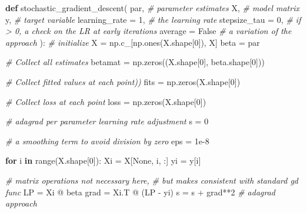 \documentclass[
  letterpaper,
]{krantz}
\newenvironment{Shaded}{}{}
\newcommand{\BuiltInTok}[1]{\textcolor[rgb]{0.00,0.50,0.00}{#1}}
\newcommand{\CommentTok}[1]{\textcolor[rgb]{0.38,0.63,0.69}{\textit{#1}}}
\newcommand{\ControlFlowTok}[1]{\textcolor[rgb]{0.00,0.44,0.13}{\textbf{#1}}}
\newcommand{\DecValTok}[1]{\textcolor[rgb]{0.25,0.63,0.44}{#1}}
\newcommand{\FloatTok}[1]{\textcolor[rgb]{0.25,0.63,0.44}{#1}}
\newcommand{\KeywordTok}[1]{\textcolor[rgb]{0.00,0.44,0.13}{\textbf{#1}}}
\newcommand{\NormalTok}[1]{#1}
\newcommand{\OperatorTok}[1]{\textcolor[rgb]{0.40,0.40,0.40}{#1}}
\newcommand{\VariableTok}[1]{\textcolor[rgb]{0.10,0.09,0.49}{#1}}
\begin{document}
\begin{Shaded}
\begin{Highlighting}[]
\KeywordTok{def}\NormalTok{ stochastic\_gradient\_descent(}
\NormalTok{    par, }\CommentTok{\# parameter estimates}
\NormalTok{    X, }\CommentTok{\# model matrix}
\NormalTok{    y, }\CommentTok{\# target variable}
\NormalTok{    learning\_rate }\OperatorTok{=} \DecValTok{1}\NormalTok{, }\CommentTok{\# the learning rate}
\NormalTok{    stepsize\_tau }\OperatorTok{=} \DecValTok{0}\NormalTok{, }\CommentTok{\# if \textgreater{} 0, a check on the LR at early iterations}
\NormalTok{    average }\OperatorTok{=} \VariableTok{False} \CommentTok{\# a variation of the approach}
\NormalTok{):}
    \CommentTok{\# initialize}
\NormalTok{    X }\OperatorTok{=}\NormalTok{ np.c\_[np.ones(X.shape[}\DecValTok{0}\NormalTok{]), X]}
\NormalTok{    beta }\OperatorTok{=}\NormalTok{ par}

    \CommentTok{\# Collect all estimates}
\NormalTok{    betamat }\OperatorTok{=}\NormalTok{ np.zeros((X.shape[}\DecValTok{0}\NormalTok{], beta.shape[}\DecValTok{0}\NormalTok{]))}

    \CommentTok{\# Collect fitted values at each point))}
\NormalTok{    fits }\OperatorTok{=}\NormalTok{ np.zeros(X.shape[}\DecValTok{0}\NormalTok{])}

    \CommentTok{\# Collect loss at each point}
\NormalTok{    loss }\OperatorTok{=}\NormalTok{ np.zeros(X.shape[}\DecValTok{0}\NormalTok{])}

    \CommentTok{\# adagrad per parameter learning rate adjustment}
\NormalTok{    s }\OperatorTok{=} \DecValTok{0}

    \CommentTok{\# a smoothing term to avoid division by zero}
\NormalTok{    eps }\OperatorTok{=} \FloatTok{1e{-}8}

    \ControlFlowTok{for}\NormalTok{ i }\KeywordTok{in} \BuiltInTok{range}\NormalTok{(X.shape[}\DecValTok{0}\NormalTok{]):}
\NormalTok{        Xi }\OperatorTok{=}\NormalTok{ X[}\VariableTok{None}\NormalTok{, i, :]}
\NormalTok{        yi }\OperatorTok{=}\NormalTok{ y[i]}

        \CommentTok{\# matrix operations not necessary here,}
        \CommentTok{\# but makes consistent with standard gd func}
\NormalTok{        LP }\OperatorTok{=}\NormalTok{ Xi }\OperatorTok{@}\NormalTok{ beta}
\NormalTok{        grad }\OperatorTok{=}\NormalTok{ Xi.T }\OperatorTok{@}\NormalTok{ (LP }\OperatorTok{{-}}\NormalTok{ yi)}
\NormalTok{        s }\OperatorTok{=}\NormalTok{ s }\OperatorTok{+}\NormalTok{ grad}\OperatorTok{**}\DecValTok{2} \CommentTok{\# adagrad approach}


\end{Highlighting}
\end{Shaded}
\end{document}
